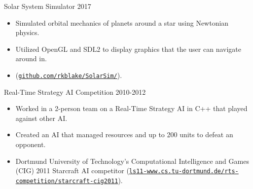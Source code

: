 \documentclass[line,margin]{res}
\begin{document}
\begin{resume}
\vspace{-6pt}
Solar System Simulator
\hfill 2017
	\begin{itemize} \itemsep -2pt
		\item Simulated orbital mechanics of planets around a star using Newtonian physics.
		\item Utilized OpenGL and SDL2 to display graphics that the user can navigate around in.
		\item (\href{https://github.com/rkblake/SolarSim/}{\texttt{github.com/rkblake/SolarSim/}}).
	\end{itemize}




\vspace{-6pt}
Real-Time Strategy AI Competition
\hfill 2010-2012
\begin{itemize} \itemsep -2pt
	\item Worked in a 2-person team on a Real-Time Strategy AI in C++ that played against other AI.
	\item Created an AI that managed resources and up to 200 units to defeat an opponent.
	\item Dortmund University of Technology’s Computational Intelligence and Games (CIG) 2011 Starcraft AI
	competitor (\href{http://ls11-www.cs.tu-dortmund.de/rts-competition/starcraft-cig2011}{\texttt{ls11-www.cs.tu-dortmund.de/rts-competition/starcraft-cig2011}}).
\end{itemize}


\end{resume}
\end{document}
